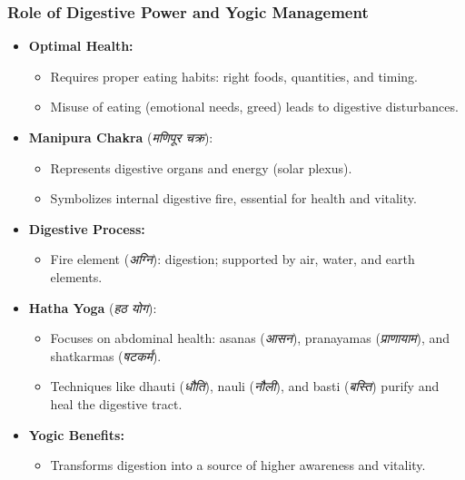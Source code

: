 \begin{frame}[fragile]\frametitle{Role of Digestive Power and Yogic Management}

    \begin{itemize}
        \item \textbf{Optimal Health:}
        \begin{itemize}
            \item Requires proper eating habits: right foods, quantities, and timing.
            \item Misuse of eating (emotional needs, greed) leads to digestive disturbances.
        \end{itemize}
        \item \textbf{Manipura Chakra} (\textit{मणिपूर चक्र}):
        \begin{itemize}
            \item Represents digestive organs and energy (solar plexus).
            \item Symbolizes internal digestive fire, essential for health and vitality.
        \end{itemize}
        \item \textbf{Digestive Process:}
        \begin{itemize}
            \item Fire element (\textit{अग्नि}): digestion; supported by air, water, and earth elements.
        \end{itemize}
        \item \textbf{Hatha Yoga} (\textit{हठ योग}):
        \begin{itemize}
            \item Focuses on abdominal health: asanas (\textit{आसन}), pranayamas (\textit{प्राणायाम}), and shatkarmas (\textit{षटकर्म}).
            \item Techniques like dhauti (\textit{धौति}), nauli (\textit{नौली}), and basti (\textit{बस्ति}) purify and heal the digestive tract.
        \end{itemize}
        \item \textbf{Yogic Benefits:}
        \begin{itemize}
            \item Transforms digestion into a source of higher awareness and vitality.
        \end{itemize}
    \end{itemize}

\end{frame}


